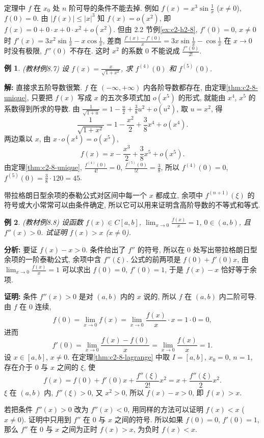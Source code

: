 \documentclass[UTF8,openany]{ctexbook}
\theoremstyle{chinesetextbook}
\newtheorem{example}{例}[section]
\newenvironment{cnproof}{\par\indent\textbf{证明:} \ignorespaces}{\par}
\newenvironment{cnsolution}{\par\indent\textbf{解:} \ignorespaces}{\par}
\begin{document}
定理中 $f$ 在 $x_0$ 处 $n$ 阶可导的条件不能去掉. 例如 $\displaystyle f(x)=x^3\sin\frac1x$ ($x\ne0$), $f(0)=0$. 由 $|f(x)|\le|x|^3$ 知 $f(x)=o(x^2)$, 即 $f(x)=0+0\cdot x+0\cdot x^2+o(x^2)$. 但由 2.2 节例\ref{ex:c2-h2-8}, $f'(0)=0$, $x\ne0$ 时 $\displaystyle f'(x)=3x^2\sin\frac1x-x\cos\frac1x$, 差商 $\displaystyle\frac{f'(x)-f'(0)}x=3x\sin\frac1x-\cos\frac1x$ 在 $x\to0$ 时没有极限, $f''(0)$ 不存在. 这时 $x^2$ 的系数 $0$ 不能说成 $\displaystyle\frac{f''(0)}{2!}$.
\begin{example}\label{ex:c2-8-7}
\textnormal{(教材例8.7)} 设 $\displaystyle f(x)=\frac x{\sqrt{1+x^2}}$, 求 $f^{(4)}(0)$ 和 $f^{(5)}(0)$.
\end{example}
\begin{cnsolution}
直接求五阶导数很繁. $f$ 在 $(-\infty,+\infty)$ 内各阶导数都存在, 由定理\ref{thm:c2-8-unique}, 只要把 $f(x)$ 写成 $x$ 的五次多项式加 $o(x^5)$ 的形式, 就能由 $x^4$, $x^5$ 的系数得到所求的导数. 由 $\displaystyle\frac1{\sqrt{1+u}}=1-\frac u2+\frac38u^2+o(u^2)$, 取 $u=x^2$, 得
\[
\frac1{\sqrt{1+x^2}}=1-\frac{x^2}2+\frac38x^4+o(x^4).
\]
两边乘以 $x$, 由 $x\cdot o(x^4)=o(x^5)$,
\[
f(x)=x-\frac{x^3}2+\frac38x^5+o(x^5).
\]
由定理\ref{thm:c2-8-unique}, $\displaystyle\frac{f^{(4)}(0)}{4!}=0$, $\displaystyle\frac{f^{(5)}(0)}{5!}=\frac38$, 所以 $f^{(4)}(0)=0$, $\displaystyle f^{(5)}(0)=\frac38\cdot120=45$.
\end{cnsolution}
带拉格朗日型余项的泰勒公式对区间中每一个 $x$ 都成立, 余项中 $f^{(n+1)}(\xi)$ 的符号或大小常常可以由条件确定, 所以它可以用来证明含高阶导数的不等式和等式.
\begin{example}\label{ex:c2-8-8}
\textnormal{(教材例8.8)} 设函数 $f(x)\in C[a,b]$, $\displaystyle\lim_{x\to0}\frac{f(x)}x=1$, $0\in(a,b)$, 且 $f''(x)>0$. 试证明 $f(x)>x$ ($x\ne0$).
\end{example}
\par\indent\textbf{分析:} 要证 $f(x)-x>0$. 条件给出了 $f''$ 的符号, 所以在 $0$ 处写出带拉格朗日型余项的一阶泰勒公式, 余项中含 $f''(\xi)$. 公式的前两项是 $f(0)+f'(0)x$, 由 $\displaystyle\lim_{x\to0}\frac{f(x)}x=1$ 可以求出 $f(0)=0$, $f'(0)=1$, 于是 $f(x)-x$ 恰好等于余项.
\begin{cnproof}
条件 $f''(x)>0$ 是对 $(a,b)$ 内的 $x$ 说的, 所以 $f$ 在 $(a,b)$ 内二阶可导. 由 $f$ 在 $0$ 连续,
\[
f(0)=\lim_{x\to0}f(x)=\lim_{x\to0}\frac{f(x)}x\cdot x=1\cdot0=0,
\]
进而
\[
f'(0)=\lim_{x\to0}\frac{f(x)-f(0)}x=\lim_{x\to0}\frac{f(x)}x=1.
\]
设 $x\in[a,b]$, $x\ne0$. 在定理\ref{thm:c2-8-lagrange} 中取 $I=[a,b]$, $x_0=0$, $n=1$, 存在介于 $0$ 与 $x$ 之间的 $\xi$, 使
\[
f(x)=f(0)+f'(0)x+\frac{f''(\xi)}{2!}x^2=x+\frac{f''(\xi)}2x^2.
\]
$\xi$ 在 $(a,b)$ 内, $f''(\xi)>0$, 又 $x^2>0$, 所以 $f(x)-x>0$, 即 $f(x)>x$.
\end{cnproof}
若把条件 $f''(x)>0$ 改为 $f''(x)<0$, 用同样的方法可以证明 $f(x)<x$ ($x\ne0$). 证明中只用到 $f''$ 在 $0$ 与 $x$ 之间的符号. 所以如果 $f(0)=0$, $f'(0)=1$, 那么 $f''$ 在 $0$ 与 $x$ 之间为正时 $f(x)>x$, 为负时 $f(x)<x$.
\end{document}
